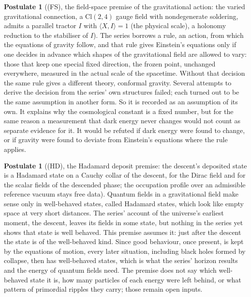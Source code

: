 \documentclass[11pt]{article}
\theoremstyle{definition}
\newtheorem{postulate}[theorem]{Postulate}
\theoremstyle{plain}
\providecommand{\Cl}{}\renewcommand{\Cl}{\mathrm{Cl}}
\providecommand{\ip}{}\renewcommand{\ip}[2]{\langle #1, #2\rangle}
\begin{document}
\begin{postulate}[(FS), the field-space premise of the gravitational action: the varied gravitational connection, a $\Cl(2,4)$ gauge field with nondegenerate soldering, admits a parallel tractor $I$ with $\ip{X}{I} = 1$ (the physical scale), a holonomy reduction to the stabiliser of $I$]\label{c:synthesis.field-space-premise-parallel-frozen-point}
The series borrows a rule, an action, from which the equations of gravity follow, and that rule gives Einstein's equations only if one decides in advance which shapes of the gravitational field are allowed to vary: those that keep one special fixed direction, the frozen point, unchanged everywhere, measured in the actual scale of the spacetime. Without that decision the same rule gives a different theory, conformal gravity. Several attempts to derive the decision from the series' own structures failed; each turned out to be the same assumption in another form. So it is recorded as an assumption of its own. It explains why the cosmological constant is a fixed number, but for the same reason a measurement that dark energy never changes would not count as separate evidence for it. It would be refuted if dark energy were found to change, or if gravity were found to deviate from Einstein's equations where the rule applies.
\end{postulate}

\begin{postulate}[(HD), the Hadamard deposit premise: the descent's deposited state is a Hadamard state on a Cauchy collar of the descent, for the Dirac field and for the scalar fields of the descended phase; the occupation profile over an admissible reference vacuum stays free data]\label{c:synthesis.hadamard-deposit-premise}
Quantum fields in a gravitational field make sense only in well-behaved states, called Hadamard states, which look like empty space at very short distances. The series' account of the universe's earliest moment, the descent, leaves its fields in some state, but nothing in the series yet shows that state is well behaved. This premise assumes it: just after the descent the state is of the well-behaved kind. Since good behaviour, once present, is kept by the equations of motion, every later situation, including black holes formed by collapse, then has well-behaved states, which is what the series' horizon results and the energy of quantum fields need. The premise does not say which well-behaved state it is, how many particles of each energy were left behind, or what pattern of primordial ripples they carry; those remain open inputs.
\end{postulate}
\end{document}
